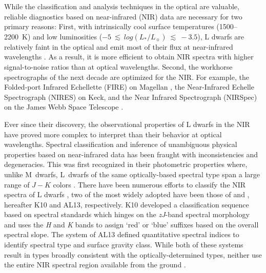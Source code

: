 \documentclass[modern,trackchanges]{aastex61}
\begin{document}
While the classification and analysis techniques in the optical are valuable, reliable diagnostics based on near-infrared (NIR) data are necessary for two primary reasons:
First, with intrinsically cool surface temperatures (1500--2200~K) and low luminosities ($-5~\lesssim~log(L_*/L_\sun)~\lesssim~-3.5$), L dwarfs are relatively faint in the optical and emit most of their flux at near-infrared wavelengths \citep[e.g.,][]{Filippazzo:2015dv}.
As a result, it is more efficient to obtain NIR spectra with higher signal-to-noise ratios than at optical wavelengths.
Second, the workhorse spectrographs of the next decade are optimized for the NIR. For example, the Folded-port Infrared Echellette (FIRE) on Magellan \citep{Simcoe:2013kh}, the Near-Infrared Echelle Spectrograph (NIRES) on Keck, and the Near Infrared Spectrograph (NIRSpec) on the James Webb Space Telescope \citep{Ferruit:2012em}.

Ever since their discovery, the observational properties of L dwarfs in the NIR have proved more complex to interpret than their behavior at optical wavelengths.
Spectral classification and inference of unambiguous physical properties based on near-infrared data has been fraught with inconsistencies and degeneracies.
This was first recognized in their photometric properties where, unlike M~dwarfs, L~dwarfs of the same optically-based spectral type span a large range of $J-K$ colors \citep[e.g.,][]{Leggett:2003tm}.
There have been numerous efforts to classify the NIR spectra of L dwarfs \citep{Reid01_NIR, Testi01, Geballe02,Burgasser07_subdwarfs}, two of the most widely adopted have been those of \citet{Kirkpatrick10} and \citet{Allers:2013hk}, hereafter K10 and AL13, respectively.
K10 developed a classification sequence based on spectral standards which hinges on the \emph{zJ}-band spectral morphology and uses the \emph{H} and \emph{K} bands to assign `red' or `blue' suffixes based on the overall spectral slope.
The system of AL13 defined quantitative spectral indices to identify spectral type and surface gravity class.
While both of these systems result in types broadly consistent with the optically-determined types, neither use the entire NIR spectral region available from the ground \citep{Kirkpatrick05}.
\end{document}
